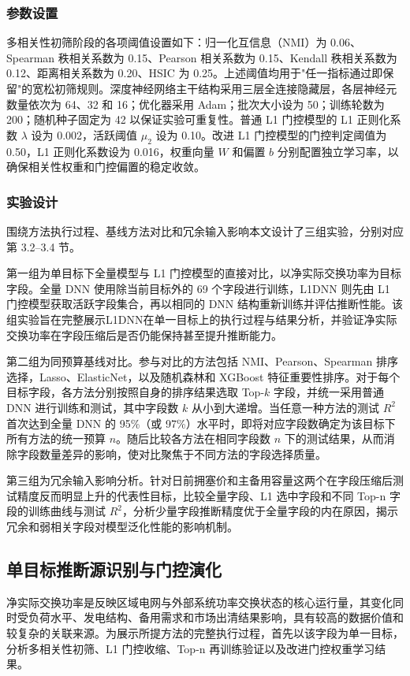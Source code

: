 \documentclass[UTF8,zihao=5,twoside]{ctexart}
\numberwithin{equation}{section}
\begin{document}
\subsubsection{参数设置}
多相关性初筛阶段的各项阈值设置如下：归一化互信息（NMI）为 0.06、Spearman 秩相关系数为 0.15、Pearson 相关系数为 0.15、Kendall 秩相关系数为 0.12、距离相关系数为 0.20、HSIC 为 0.25。上述阈值均用于"任一指标通过即保留"的宽松初筛规则。深度神经网络主干结构采用三层全连接隐藏层，各层神经元数量依次为 64、32 和 16；优化器采用 Adam\cite{ref-kingma-adam}；批次大小设为 50；训练轮数为 200；随机种子固定为 42 以保证实验可重复性。普通 L1 门控模型的 L1 正则化系数 $\lambda$ 设为 0.002，活跃阈值 $\mu_2$ 设为 0.10。改进 L1 门控模型的门控判定阈值为 0.50，L1 正则化系数设为 0.016，权重向量 $W$ 和偏置 $b$ 分别配置独立学习率，以确保相关性权重和门控偏置的稳定收敛。

\subsubsection{实验设计}
围绕方法执行过程、基线方法对比和冗余输入影响本文设计了三组实验，分别对应第 3.2--3.4 节。

第一组为单目标下全量模型与 L1 门控模型的直接对比，以净实际交换功率为目标字段。全量 DNN 使用除当前目标外的 69 个字段进行训练，L1DNN 则先由 L1 门控模型获取活跃字段集合，再以相同的 DNN 结构重新训练并评估推断性能。该组实验旨在完整展示L1DNN在单一目标上的执行过程与结果分析，并验证净实际交换功率在字段压缩后是否仍能保持甚至提升推断能力。

第二组为同预算基线对比。参与对比的方法包括 NMI、Pearson、Spearman 排序选择，Lasso、ElasticNet，以及随机森林和 XGBoost 特征重要性排序。对于每个目标字段，各方法分别按照自身的排序结果选取 Top-$k$ 字段，并统一采用普通 DNN 进行训练和测试，其中字段数 $k$ 从小到大递增。当任意一种方法的测试 $R^2$ 首次达到全量 DNN 的 95\%（或 97\%）水平时，即将对应字段数确定为该目标下所有方法的统一预算 $n$。随后比较各方法在相同字段数 $n$ 下的测试结果，从而消除字段数量差异的影响，使对比聚焦于不同方法的字段选择质量。

第三组为冗余输入影响分析。针对日前拥塞价和主备用容量这两个在字段压缩后测试精度反而明显上升的代表性目标，比较全量字段、L1 选中字段和不同 Top-n 字段的训练曲线与测试 $R^2$，分析少量字段推断精度优于全量字段的内在原因，揭示冗余和弱相关字段对模型泛化性能的影响机制。

\subsection{单目标推断源识别与门控演化}
净实际交换功率是反映区域电网与外部系统功率交换状态的核心运行量，其变化同时受负荷水平、发电结构、备用需求和市场出清结果影响，具有较高的数据价值和较复杂的关联来源。为展示所提方法的完整执行过程，首先以该字段为单一目标，分析多相关性初筛、L1 门控收缩、Top-n 再训练验证以及改进门控权重学习结果。
\end{document}
